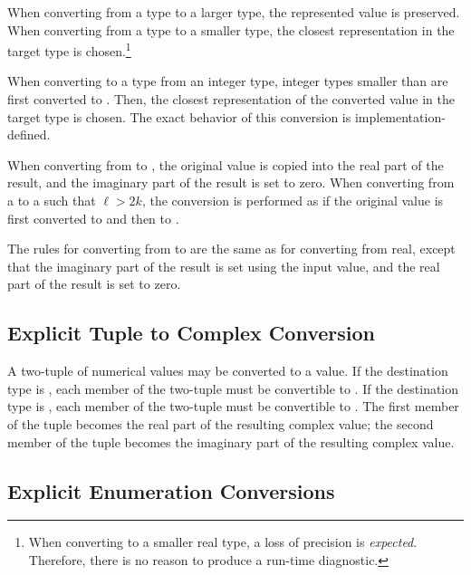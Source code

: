 When converting from a  type to a larger  type, the
represented value is preserved.  When converting from a  type to a
smaller  type, the closest representation in the target type is
chosen.\footnote{When converting to a smaller real type, a loss of precision is \emph{expected}.
Therefore, there is no reason to produce a run-time diagnostic.}

When converting to a  type from an integer type, integer types
smaller than  are first converted to .  Then, the closest
representation of the converted value in the target type is chosen.  The exact
behavior of this conversion is implementation-defined.

When converting from  to , the original
value is copied into the real part of the result, and the imaginary part of the
result is set to zero.  When converting from a  to
a  such that $\ell > 2k$, the conversion is performed as
if the original value is first converted to  and then
to \chpl{$\ell$}.

The rules for converting from  to  are the same as for
converting from real, except that the imaginary part of the result is set using
the input value, and the real part of the result is set to zero.

\subsection{Explicit Tuple to Complex Conversion}
\label{Explicit_Tuple_to_Complex_Conversion}

A two-tuple of numerical values may be converted to a  value.  If
the destination type is , each member of the two-tuple must
be convertible to .  If the destination type
is , each member of the two-tuple must be convertible
to .  The first member of the tuple becomes the real part of the
resulting complex value; the second member of the tuple becomes the imaginary
part of the resulting complex value.

\subsection{Explicit Enumeration Conversions}
\label{Explicit_Enumeration_Conversions}

